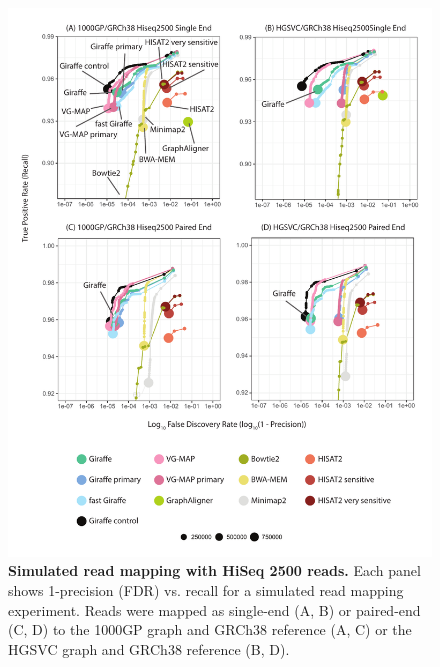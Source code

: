 \documentclass[11pt]{ucscthesis}
\begin{document}
\begin{figure}[H]
    \centering
    \includegraphics[width=.8\linewidth]{aim2_supplement_hiseq2500-all.pdf}
    \caption[Simulated read mapping with HiSeq 2500 reads]{\textbf{Simulated read mapping with HiSeq 2500 reads.} Each panel shows 1-precision (FDR) vs. recall for a simulated read mapping experiment. Reads were mapped as single-end (A, B) or paired-end (C, D) to the 1000GP graph and GRCh38 reference (A, C) or the HGSVC graph and GRCh38 reference (B, D).}
    \label{fig:aim2_supplement_hiseq2500_rocs}
\end{figure}
\end{document}
